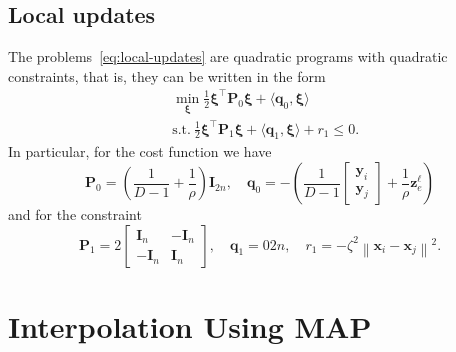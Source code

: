 \documentclass{article}
\newcommand{\norm}[1]{\left\lVert#1\right\rVert}
\newcommand{\q}{\mathbold{q}}
\newcommand{\x}{\mathbold{x}}
\newcommand{\y}{\mathbold{y}}
\newcommand{\z}{\mathbold{z}}
\newcommand{\xx}{\pmb{\xi}}
\renewcommand{\Im}{\mathbold{I}}
\newcommand{\Pm}{\mathbold{P}}
\begin{document}
\subsection{Local updates}
The problems~\eqref{eq:local-updates} are quadratic programs with quadratic constraints, that is, they can be written in the form
\begin{subequations}
\begin{align}
	&\min_{\xx} \frac{1}{2} \xx^\top \Pm_0 \xx + \langle \q_0, \xx \rangle \\
	&\text{s.t.} \ \frac{1}{2} \xx^\top \Pm_1 \xx + \langle \q_1, \xx \rangle + r_1 \leq 0.
\end{align}
\end{subequations}
In particular, for the cost function we have
$$
	\Pm_0 = \left( \frac{1}{D-1} + \frac{1}{\rho} \right) \Im_{2n}, \quad \q_0 = - \left( \frac{1}{D-1} \begin{bmatrix} \y_i \\ \y_j \end{bmatrix} + \frac{1}{\rho} \z_e^\ell \right)
$$
and for the constraint
$$
	\Pm_1 = 2 \begin{bmatrix} \Im_n & - \Im_n \\ - \Im_n & \Im_n \end{bmatrix}, \quad \q_1 = 0{2n}, \quad r_1 = - \zeta^2 \norm{\x_i - \x_j}^2.
$$

\section{Interpolation Using MAP}


\end{document}
